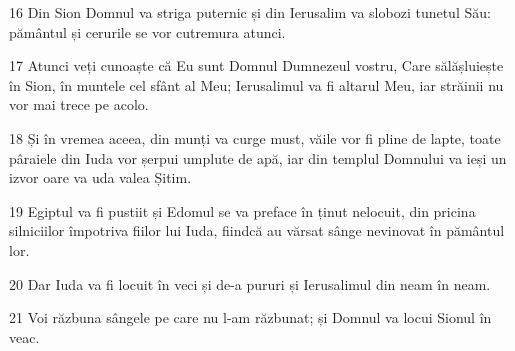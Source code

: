 \par 16 Din Sion Domnul va striga puternic și din Ierusalim va slobozi tunetul Său: pământul și cerurile se vor cutremura atunci.
\par 17 Atunci veți cunoaște că Eu sunt Domnul Dumnezeul vostru, Care sălășluiește în Sion, în muntele cel sfânt al Meu; Ierusalimul va fi altarul Meu, iar străinii nu vor mai trece pe acolo.
\par 18 Și în vremea aceea, din munți va curge must, văile vor fi pline de lapte, toate pâraiele din Iuda vor șerpui umplute de apă, iar din templul Domnului va ieși un izvor oare va uda valea Șitim.
\par 19 Egiptul va fi pustiit și Edomul se va preface în ținut nelocuit, din pricina silniciilor împotriva fiilor lui Iuda, fiindcă au vărsat sânge nevinovat în pământul lor.
\par 20 Dar Iuda va fi locuit în veci și de-a pururi și Ierusalimul din neam în neam.
\par 21 Voi răzbuna sângele pe care nu l-am răzbunat; și Domnul va locui Sionul în veac.



